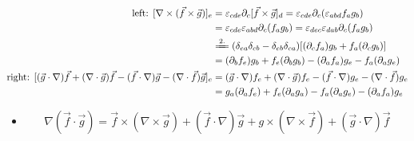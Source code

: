\documentclass{article}
\begin{document}
$$\begin{aligned}
        \text{left: }[\nabla\times(\vec{f}\times\vec{g})]_{e}                                                                             & =\varepsilon_{cde}\partial_{c}[\vec{f}\times\vec{g}]_{d}=\varepsilon_{cde}\partial_{c}(\varepsilon_{abd}f_{a}g_{b})    \\
                                                                                                                                          & =\varepsilon_{cde}\varepsilon_{abd}\partial_{c}(f_{a}g_{b})=\varepsilon_{dec}\varepsilon_{dab}\partial_{c}(f_{a}g_{b}) \\
                                                                                                                                          & \xlongequal{2.}(\delta_{ea}\delta_{cb}-\delta_{eb}\delta_{ca})[(\partial_{c}f_{a})g_{b}+f_{a}(\partial_{c}g_{b})]      \\
                                                                                                                                          & =(\partial_{b}f_{e})g_{b}+f_{e}(\partial_{b}g_{b})-(\partial_{a}f_{a})g_{e}-f_{a}(\partial_{a}g_{e})                   \\
        \text{right: }[(\vec{g}\cdot\nabla)\vec{f}+(\nabla\cdot\vec{g})\vec{f}-(\vec{f}\cdot\nabla)\vec{g}-(\nabla\cdot\vec{f})\vec{g}]_e & =(\vec{g}\cdot\nabla)f_{e}+(\nabla\cdot\vec{g})f_{e}-(\vec{f}\cdot\nabla)g_{e}-(\nabla\cdot\vec{f})g_{e}               \\
                                                                                                                                          & =g_a(\partial_{a}f_{e})+f_{e}(\partial_{a}g_{a})-f_{a}(\partial_{a}g_{e})-(\partial_{a}f_{a})g_{e}
    \end{aligned}$$

\begin{itemize}
    \item $$\nabla(\vec{f}\cdot\vec{g})=\vec{f}\times(\nabla\times\vec{g})+(\vec{f}\cdot\nabla)\vec{g}+g\times(\nabla\times\vec{f})+(\vec{g}\cdot\nabla)\vec{f}$$
\end{itemize}
\end{document}
